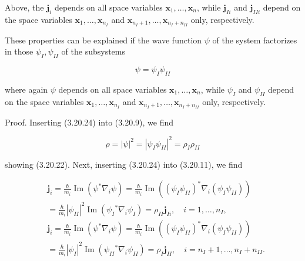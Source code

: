 \documentclass{article}
\begin{document}
Above, the $\boldsymbol{j}_{i}$ depends on all space variables $\boldsymbol{x}_{1}, \ldots, \boldsymbol{x}_{n}$, while $\boldsymbol{j}_{I i}$ and $\boldsymbol{j}_{I I i}$ depend on the space variables $\boldsymbol{x}_{1}, \ldots, \boldsymbol{x}_{n_{I}}$ and $\boldsymbol{x}_{n_{I}+1}, \ldots, \boldsymbol{x}_{n_{I}+n_{I I}}$ only, respectively.

These properties can be explained if the wave function $\psi$ of the system factorizes in those $\psi_{I}, \psi_{I I}$ of the subsystems
 
\begin{equation*}
\psi=\psi_{I} \psi_{I I} \tag{3.20.24}
\end{equation*}
 
where again $\psi$ depends on all space variables $\boldsymbol{x}_{1}, \ldots, \boldsymbol{x}_{n}$, while $\psi_{I}$ and $\psi_{I I}$ depend on the space variables $\boldsymbol{x}_{1}, \ldots, \boldsymbol{x}_{n_{I}}$ and $\boldsymbol{x}_{n_{I}+1}, \ldots, \boldsymbol{x}_{n_{I}+n_{I I}}$ only, respectively.

Proof. Inserting (3.20.24) into (3.20.9), we find
 
\begin{equation*}
\rho=|\psi|^{2}=\left|\psi_{I} \psi_{I I}\right|^{2}=\rho_{I} \rho_{I I} \tag{3.20.25}
\end{equation*}
 
showing (3.20.22). Next, inserting (3.20.24) into (3.20.11), we find
 
\begin{align*}
& \boldsymbol{j}_{i}=\frac{\hbar}{m_{i}} \operatorname{Im}\left(\psi^{*} \nabla_{i} \psi\right)=\frac{\hbar}{m_{i}} \operatorname{Im}\left(\left(\psi_{I} \psi_{I I}\right)^{*} \nabla_{i}\left(\psi_{I} \psi_{I I}\right)\right)  \tag{3.20.26}\\
& =\frac{\hbar}{m_{i}}\left|\psi_{I I}\right|^{2} \operatorname{Im}\left(\psi_{I}{ }^{*} \nabla_{i} \psi_{I}\right)=\rho_{I I} \boldsymbol{j}_{I i}, \quad i=1, \ldots, n_{I}, \\
& \boldsymbol{j}_{i}=\frac{\hbar}{m_{i}} \operatorname{Im}\left(\psi^{*} \nabla_{i} \psi\right)=\frac{\hbar}{m_{i}} \operatorname{Im}\left(\left(\psi_{I} \psi_{I I}\right)^{*} \nabla_{i}\left(\psi_{I} \psi_{I I}\right)\right) \\
& =\frac{\hbar}{m_{i}}\left|\psi_{I}\right|^{2} \operatorname{Im}\left(\psi_{I I}{ }^{*} \nabla_{i} \psi_{I I}\right)=\rho_{I} \boldsymbol{j}_{I I}, \quad i=n_{I}+1, \ldots, n_{I}+n_{I I} .
\end{align*}
 
\end{document}
